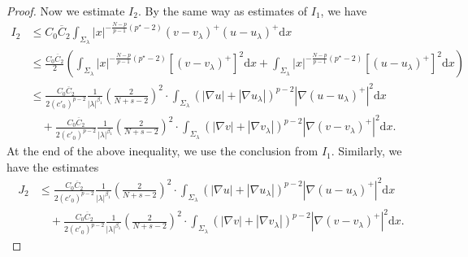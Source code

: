 \documentclass[12pt]{amsart}
\theoremstyle{definition}
\theoremstyle{remark}
\theoremstyle{conclusion}
\theoremstyle{conjecture}
\numberwithin{equation}{section}
\begin{document}
\begin{proof}
\smallskip

Now we estimate $I_2$. By the same way as estimates of $I_1$, we have
\begin{align}\label{eq0810}
    I_2 &\leq C_0 \overline{C}_2 \int_{\Sigma_\lambda} |x|^{-\frac{N-p}{p-1}(p^{\star}-2)} (v-v_\lambda)^+  (u-u_\lambda)^+ \mathrm{d}x \\
        &\leq \frac{C_0 \overline{C}_2}{2}\left(\int_{\Sigma_\lambda} |x|^{-\frac{N-p}{p-1}(p^{\star}-2)} [(v-v_\lambda)^+]^2 \mathrm{d}x + \int_{\Sigma_\lambda} |x|^{-\frac{N-p}{p-1}(p^{\star}-2)} [(u-u_\lambda)^+]^2 \mathrm{d}x\right) \nonumber\\
        &\leq \frac{C_0 \overline{C}_2}{2(c'_0)^{p-2}}\frac{1}{|\lambda|^{\beta_1}}\left( \frac{2}{N+s-2} \right)^2 \cdot \int_{\Sigma_\lambda}  (|\nabla u|+|\nabla u_\lambda|)^{p-2} |\nabla(u-u_\lambda)^+|^2 \mathrm{d}x \nonumber\\
        &\quad+ \frac{C_0 \overline{C}_2}{2(c'_0)^{p-2}}\frac{1}{|\lambda|^{\beta_1}}\left( \frac{2}{N+s-2} \right)^2 \cdot \int_{\Sigma_\lambda}  (|\nabla v|+|\nabla v_\lambda|)^{p-2} |\nabla(v-v_\lambda)^+|^2 \mathrm{d}x. \nonumber
\end{align}
At the end of the above inequality, we use the conclusion from $I_1$. Similarly, we have the estimates
\begin{align}\label{eq0810-}
    J_2&\leq \frac{C_0 \overline{C}_2}{2(c'_0)^{p-2}}\frac{1}{|\lambda|^{\beta_1}}\left( \frac{2}{N+s-2} \right)^2 \cdot \int_{\Sigma_\lambda}  (|\nabla u|+|\nabla u_\lambda|)^{p-2} |\nabla(u-u_\lambda)^+|^2 \mathrm{d}x \\
&\quad+ \frac{C_0 \overline{C}_2}{2(c'_0)^{p-2}}\frac{1}{|\lambda|^{\beta_1}}\left( \frac{2}{N+s-2} \right)^2 \cdot \int_{\Sigma_\lambda}  (|\nabla v|+|\nabla v_\lambda|)^{p-2} |\nabla(v-v_\lambda)^+|^2 \mathrm{d}x. \nonumber
\end{align}


\end{proof}
\end{document}
